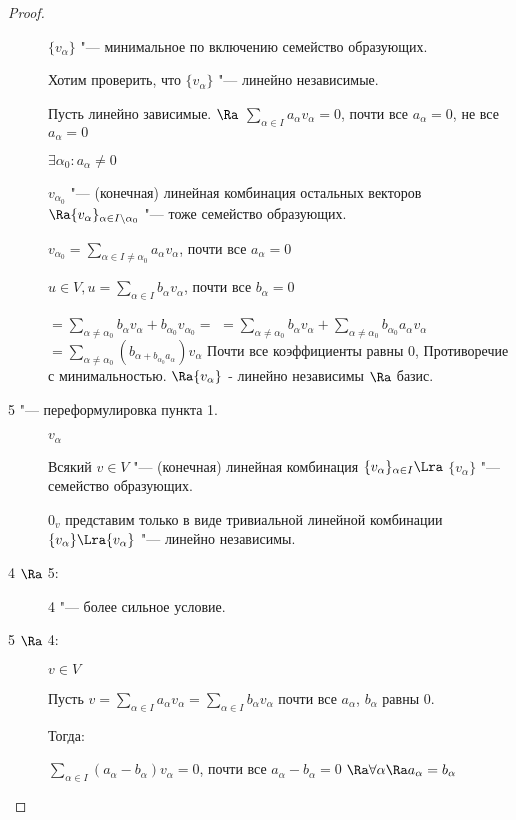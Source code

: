 \begin{proof}
\begin{description}
$\{v_{\alpha}\}$  "--- минимальное по включению семейство образующих. 

Хотим проверить, что $\{v_{\alpha}\}$ "--- линейно независимые.

Пусть линейно зависимые. $\Ra$
$\sum_{\alpha \in I} a_{\alpha}v_{\alpha} = 0$, почти все
$a_{\alpha} = 0$, не все $a_{\alpha} = 0$

$\exists \alpha_0: a_{\alpha} \ne 0$

$v_{\alpha_0}$ "--- (конечная) линейная комбинация остальных векторов 
$\Ra \{v_{\alpha}\}_{\alpha \in I \setminus {\alpha_0}}$ 
"--- тоже семейство образующих.

$v_{\alpha_0} = \sum_{\alpha \in I \ne \alpha_0} a_{\alpha}v_{\alpha}$,
почти все $a_{\alpha} = 0$ 

$u \in V, u = \sum_{\alpha \in I}b_{\alpha}v_{\alpha}$, 
почти все $b_{\alpha} = 0$

$= \sum_{\alpha \ne \alpha_{0}}b_{\alpha}v_{\alpha} + b_{\alpha_0}v_{\alpha_0} =$
$= \sum_{\alpha \ne \alpha_{0}}b_{\alpha}v_{\alpha} + \sum_{\alpha \ne \alpha_{0}}b_{\alpha_0}a_{\alpha}v_{\alpha}$ 
$= \sum _{\alpha \ne \alpha_0}(b_{\alpha + b_{\alpha_0}a_{\alpha}})v_{\alpha}$
Почти все коэффициенты равны 0, Противоречие с минимальностью. $\Ra {v_{\alpha}}$ - линейно независимы $\Ra$ базис.

\item [5 "--- переформулировка пункта 1.]

${v_{\alpha}}$

Всякий $v \in V$ "--- (конечная) линейная комбинация $\{v_{\alpha}\}_{\alpha \in I} \Lra$ 
$\{v_{\alpha}\}$ "--- семейство образующих.

$0_v$ представим только в виде тривиальной линейной комбинации $\{v_{\alpha}\}  \Lra \{v_{\alpha}\}$ "--- линейно независимы.

\item [4 $\Ra$ 5:]
4 "--- более сильное условие.

\item [5 $\Ra$ 4:]

$v \in V$

Пусть $v = \sum_{\alpha \in I}a_{\alpha}v_{\alpha} = \sum_{\alpha \in I} b_{\alpha}v_{\alpha}$
почти все $a_{\alpha}$, $b_{\alpha}$ равны 0.

Тогда:
                                                            
$\sum_{\alpha \in I}(a_{\alpha} - b_{\alpha})v_{\alpha} = 0$,  почти все $a_{\alpha} - b_{\alpha} = 0$
$\Ra \forall \alpha \Ra a_\alpha = b_\alpha$
\end{description}
\end{proof}

